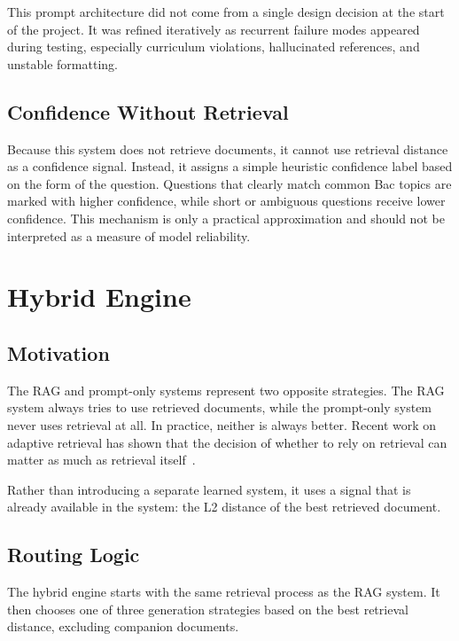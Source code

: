 This prompt architecture did not come from a single design decision at the
start of the project. It was refined iteratively as recurrent failure modes
appeared during testing, especially curriculum violations, hallucinated
references, and unstable formatting.

\subsection{Confidence Without Retrieval}

Because this system does not retrieve documents, it cannot use retrieval
distance as a confidence signal. Instead, it assigns a simple heuristic
confidence label based on the form of the question. Questions that clearly
match common Bac topics are marked with higher confidence, while short or
ambiguous questions receive lower confidence. This mechanism is only a
practical approximation and should not be interpreted as a measure of model reliability.

\section{Hybrid Engine}
\label{sec:hybrid}

\subsection{Motivation}

The RAG and prompt-only systems represent two opposite strategies. The RAG
system always tries to use retrieved documents, while the prompt-only system
never uses retrieval at all. In practice, neither is always better.
Recent work on adaptive retrieval has shown that the decision of whether to
rely on retrieval can matter as much as retrieval itself~\cite{yan2024practical_rag,asai2023self_rag}.

Rather than introducing a separate learned system, it uses a signal that is
already available in the system: the L2 distance of the best retrieved
document.

\subsection{Routing Logic}

The hybrid engine starts with the same retrieval process as the RAG system.
It then chooses one of three generation strategies based on the best
retrieval distance, excluding companion documents.

